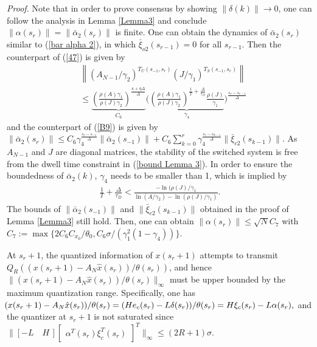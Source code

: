 \documentclass[letterpaper,journal,final,twocolumn]{IEEEtran}
\begin{document}
\emph{Proof.}
Note that in order to prove consensus by showing $\|\delta(k)\|\to 0$, one can follow the analysis in Lemma \ref{Lemma3} and conclude $\|\alpha(s_r)\|=\|\bar \alpha_2(s_{r})\|$ is finite. 
One can obtain the dynamics of $\bar \alpha_2(s_{r}) $ similar to (\ref{bar alpha 2}), in which $\bar \xi_{o2}(s_{r-1})=0$ for all $s_{r-1}$. Then the counterpart of (\ref{47}) is given by 
\begin{align}\label{scalar 60}
& \left\|
(A_{N-1}/\gamma_2 )^{  T_U(s_{-1},s_r)}
(J/\gamma_1)^{  T_S(s_{-1},s_r)}
\right\|
\nonumber\\
& \le \underbrace{\left(\frac{\rho(A) \gamma_1}{\rho(J)\gamma_2}\right)^{\frac{\kappa + \eta \Delta}{\Delta}} }
_{C_6}
\bigg(
\underbrace{\left(
	\frac{\rho(A)\gamma_1}{\rho(J)\gamma_2}
	\right)^{\frac{1}{T}+ \frac{\Delta}{\tau_D}}
	\frac{\rho(J)}{\gamma_1}}
_{\gamma_4}
\bigg)
^{\frac{s_r-s_{r-1}}{\Delta}} \!\!\!\!
\end{align}  
and the counterpart of (\ref{B9}) is given by 
$
\|\bar \alpha_2(s_r)\| 
\le C_6 \gamma_4 ^{  \frac{s_r- s_{-1}}{\Delta}}  \| \bar \alpha_2(s_{-1}) \|
+ C_6 \sum_{k=0}^{r} \gamma_4 ^{\frac{s_r - s_{k-1}}{\Delta}} \|\bar \xi _{c2}(s_{k-1})\|.
$
As $A_{N-1}$ and $J$ are diagonal matrices, the stability of the switched system is free from the dwell time constraint in (\ref{bound Lemma 3}). In order to ensure the boundedness of $\bar \alpha_2(k)$, $\gamma_4$ needs to be smaller than 1, which is implied by 
\begin{align}\label{64}
	\frac{1}{T} + \frac{\Delta}{\tau_D} <
	\frac{- \ln  (\rho(J)/\gamma_1 }{\ln (A/\gamma_2 )-  \ln  (\rho(J)/\gamma_1)}.
\end{align}
The bounds of $\|\bar \alpha_2(s_{-1})\|$ and $\|\bar \xi_{c2} (s_{k-1})\|$ obtained in the proof of Lemma \ref{Lemma3} still hold. Then, one can obtain $\|\alpha(s_r)\|\le \sqrt{N}C_7$ with $C_7:=\max\{2C_6C_{x_0}/\theta_0, C_6\sigma /(\gamma_1^2 (1-\gamma_4))\}$.




At $s_r + 1$, the quantized information of $x(s_r + 1)$ attempts to transmit
$
Q_R\left( ( x(s_r + 1) - A_N \hat x(s_r)  )       /\theta (s_r) \right)$, and hence $\| (x(s_r + 1) - A_N \hat x(s_r)  )/\theta (s_r) \|_\infty $ must be upper bounded by the maximum quantization range. Specifically, one has
$
\!\!(x(s_r + 1) - A_N \hat x(s_r))/\theta (s_r)= (H e_c(s_r) - L \delta(s_r) )/\theta(s_r) \nonumber\\
=  H \xi_c(s_r) - L \alpha(s_r),
$
and the quantizer at $s_r + 1$ is not saturated since 
$
\| [-L \quad H\,]   
\left[
\begin{array}{ll}
\alpha^T(s_r) 
\xi^T _c (s_r)
\end{array}
\right]^T
\|_\infty 
\le (2R + 1) \sigma. 
$
\end{document}
